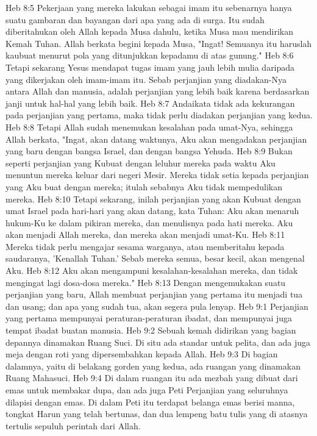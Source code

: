 Heb 8:5  Pekerjaan yang mereka lakukan sebagai imam itu sebenarnya hanya suatu gambaran dan bayangan dari apa yang ada di surga. Itu sudah diberitahukan oleh Allah kepada Musa dahulu, ketika Musa mau mendirikan Kemah Tuhan. Allah berkata begini kepada Musa, "Ingat! Semuanya itu haruslah kaubuat menurut pola yang ditunjukkan kepadamu di atas gunung."
Heb 8:6  Tetapi sekarang Yesus mendapat tugas imam yang jauh lebih mulia daripada yang dikerjakan oleh imam-imam itu. Sebab perjanjian yang diadakan-Nya antara Allah dan manusia, adalah perjanjian yang lebih baik karena berdasarkan janji untuk hal-hal yang lebih baik.
Heb 8:7  Andaikata tidak ada kekurangan pada perjanjian yang pertama, maka tidak perlu diadakan perjanjian yang kedua.
Heb 8:8  Tetapi Allah sudah menemukan kesalahan pada umat-Nya, sehingga Allah berkata, "Ingat, akan datang waktunya, Aku akan mengadakan perjanjian yang baru dengan bangsa Israel, dan dengan bangsa Yehuda.
Heb 8:9  Bukan seperti perjanjian yang Kubuat dengan leluhur mereka pada waktu Aku menuntun mereka keluar dari negeri Mesir. Mereka tidak setia kepada perjanjian yang Aku buat dengan mereka; itulah sebabnya Aku tidak mempedulikan mereka.
Heb 8:10  Tetapi sekarang, inilah perjanjian yang akan Kubuat dengan umat Israel pada hari-hari yang akan datang, kata Tuhan: Aku akan menaruh hukum-Ku ke dalam pikiran mereka, dan menulisnya pada hati mereka. Aku akan menjadi Allah mereka, dan mereka akan menjadi umat-Ku.
Heb 8:11  Mereka tidak perlu mengajar sesama warganya, atau memberitahu kepada saudaranya, 'Kenallah Tuhan.' Sebab mereka semua, besar kecil, akan mengenal Aku.
Heb 8:12  Aku akan mengampuni kesalahan-kesalahan mereka, dan tidak mengingat lagi dosa-dosa mereka."
Heb 8:13  Dengan mengemukakan suatu perjanjian yang baru, Allah membuat perjanjian yang pertama itu menjadi tua dan usang; dan apa yang sudah tua, akan segera pula lenyap.
Heb 9:1  Perjanjian yang pertama mempunyai peraturan-peraturan ibadat, dan mempunyai juga tempat ibadat buatan manusia.
Heb 9:2  Sebuah kemah didirikan yang bagian depannya dinamakan Ruang Suci. Di situ ada standar untuk pelita, dan ada juga meja dengan roti yang dipersembahkan kepada Allah.
Heb 9:3  Di bagian dalamnya, yaitu di belakang gorden yang kedua, ada ruangan yang dinamakan Ruang Mahasuci.
Heb 9:4  Di dalam ruangan itu ada mezbah yang dibuat dari emas untuk membakar dupa, dan ada juga Peti Perjanjian yang seluruhnya dilapisi dengan emas. Di dalam Peti itu terdapat belanga emas berisi manna, tongkat Harun yang telah bertunas, dan dua lempeng batu tulis yang di atasnya tertulis sepuluh perintah dari Allah.
